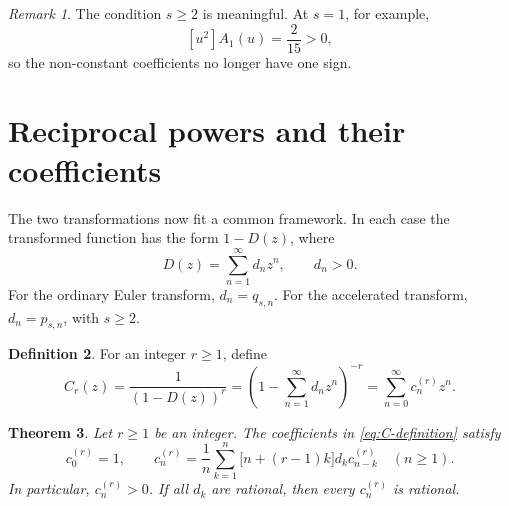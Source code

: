 \documentclass[11pt,reqno]{amsart}
\numberwithin{equation}{section}
\newtheorem{theorem}{Theorem}[section]
\theoremstyle{definition}
\newtheorem{definition}[theorem]{Definition}
\theoremstyle{remark}
\newtheorem{remark}[theorem]{Remark}
\begin{document}
\begin{remark}\label{rem:s-threshold}
The condition \(s\geq2\) is meaningful.  At \(s=1\), for example,
\[
 [u^2]A_1(u)=\frac2{15}>0,
\]
so the non-constant coefficients no longer have one sign.
\end{remark}


\section{Reciprocal powers and their coefficients}
\label{sec:reciprocal-coefficients}

The two transformations now fit a common framework.  In each case the
transformed function has the form \(1-D(z)\), where
\begin{equation}\label{eq:common-shape}
 D(z)=\sum_{n=1}^{\infty}d_nz^n,\qquad d_n>0.
\end{equation}
For the ordinary Euler transform, \(d_n=q_{s,n}\).  For the
accelerated transform, \(d_n=p_{s,n}\), with \(s\geq2\).

\begin{definition}
For an integer \(r\geq1\), define
\begin{equation}\label{eq:C-definition}
 C_r(z)
 =\frac{1}{(1-D(z))^r}
 =\left(1-\sum_{n=1}^{\infty}d_nz^n\right)^{-r}
 =\sum_{n=0}^{\infty}c_n^{(r)}z^n.
\end{equation}
\end{definition}

\begin{theorem}\label{thm:recurrence}
Let \(r\geq1\) be an integer.  The coefficients in
\eqref{eq:C-definition} satisfy
\begin{equation}\label{eq:recurrence}
 c_0^{(r)}=1,\qquad
 c_n^{(r)}
 =\frac1n\sum_{k=1}^{n}
 \bigl[n+(r-1)k\bigr]d_kc_{n-k}^{(r)}
 \quad(n\geq1).
\end{equation}
In particular, \(c_n^{(r)}>0\).  If all \(d_k\) are rational, then
every \(c_n^{(r)}\) is rational.
\end{theorem}
\end{document}
